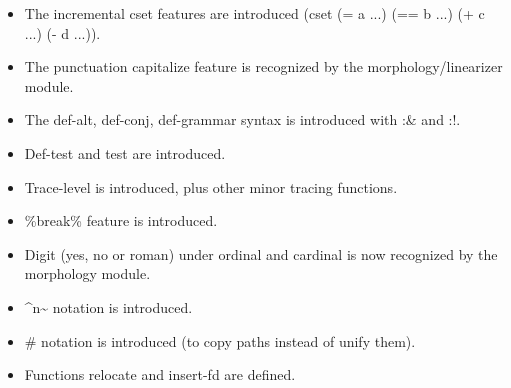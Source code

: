 \documentclass[10pt,a4paper]{report}
\begin{document}
\begin{appendices}
\begin{itemize}
\item The incremental cset features are introduced (cset (= a ...) (== b ...) (+ c ...) (- d ...)).

\item  The punctuation capitalize feature is recognized by the morphology/linearizer module.

\item  The def-alt, def-conj, def-grammar syntax is introduced with :\& and :!.

\item Def-test and test are introduced.

\item Trace-level is introduced, plus other minor tracing functions.

\item \%break\% feature is introduced.

\item Digit (yes, no or roman) under ordinal and cardinal is now recognized by the morphology module. 

\item \^{}n\~{} notation is introduced.

\item \#{} notation is introduced (to copy paths instead of unify them).

\item Functions relocate and insert-fd are defined.
\end{itemize}

\end{appendices}



\printindex
\end{document}

